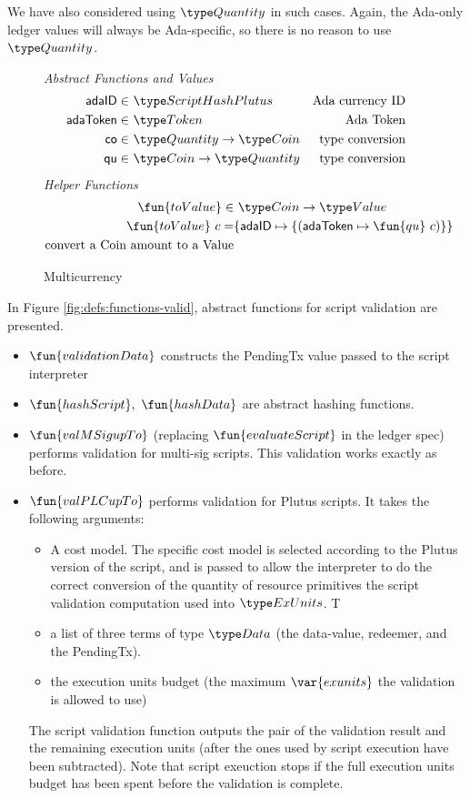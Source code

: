 We have also considered using $\Quantity$ in such cases. Again, the Ada-only
ledger values will always be Ada-specific, so there is no reason to use $\Quantity$.


\begin{figure*}[htb]
  \emph{Abstract Functions and Values}
  \begin{align*}
    \mathsf{adaID} \in& ~\ScriptHashPlutus
    & \text{Ada currency ID} \\
    \mathsf{adaToken} \in& ~\Token
    & \text{Ada Token} \\
    \mathsf{co} \in& ~\Quantity \to \Coin
    & \text{type conversion} \\
    \mathsf{qu} \in& ~\Coin \to \Quantity
    & \text{type conversion} \\
  \end{align*}
  \emph{Helper Functions}
  \begin{align*}
    \fun{toValue} \in & ~\Coin\to \Value \\
    \fun{toValue}~ c = & \{\mathsf{adaID} \mapsto \{(\mathsf{adaToken} \mapsto \fun{qu}~c)\}\} \\
    \text{convert a Coin amount to a Value} \\
  \end{align*}
  \caption{Multicurrency}
  \label{fig:defs:functions-helper}
\end{figure*}

In Figure \ref{fig:defs:functions-valid}, abstract functions for script validation
are presented.

\begin{itemize}
  \item $\fun{validationData}$ constructs the PendingTx value passed
  to the script interpreter
  \item $\fun{hashScript},~ \fun{hashData}$ are abstract hashing functions.
  \item $\fun{valMSigupTo}$ (replacing $\fun{evaluateScript}$ in the ledger spec) performs
  validation for multi-sig scripts.
  This validation works exactly as before.
  \item $\fun{valPLCupTo}$ performs validation for Plutus scripts. It takes the following
  arguments:
  \begin{itemize}
  \item A cost model. The specific cost model is selected according to the Plutus
  version of the script, and is passed to allow the interpreter to do the
  correct conversion of the quantity of resource primitives the script validation
  computation used into $\ExUnits$. T
  \item
  a list of three terms of type $\Data$ (the data-value, redeemer,
  and the PendingTx).
  \item the execution units budget (the maximum $\var{exunits}$
  the validation is allowed to use)
  \end{itemize}
  The script validation function outputs the pair of the validation result
  and the remaining execution units (after the ones used by script execution
  have been subtracted). Note that script exeuction stops if the full execution
  units budget has been spent before the validation is complete.
\end{itemize}


